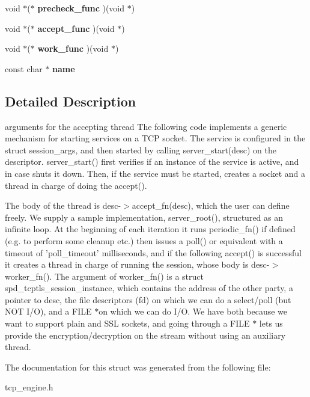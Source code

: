 \begin{DoxyCompactItemize}
\item 
\hypertarget{structspd__tcp__session__arg_ac015effc58bcab5bea3170e7c7cfa53c}{
void $\ast$($\ast$ {\bfseries precheck\_\-func} )(void $\ast$)}
\label{structspd__tcp__session__arg_ac015effc58bcab5bea3170e7c7cfa53c}

\item 
\hypertarget{structspd__tcp__session__arg_a3e7a2fb41f02b462df216cf56d269ee9}{
void $\ast$($\ast$ {\bfseries accept\_\-func} )(void $\ast$)}
\label{structspd__tcp__session__arg_a3e7a2fb41f02b462df216cf56d269ee9}

\item 
\hypertarget{structspd__tcp__session__arg_a23943ff609f6a23365b1bb234cc464ce}{
void $\ast$($\ast$ {\bfseries work\_\-func} )(void $\ast$)}
\label{structspd__tcp__session__arg_a23943ff609f6a23365b1bb234cc464ce}

\item 
\hypertarget{structspd__tcp__session__arg_a53e01dfdf07f6a394394e6e31a8e6afc}{
const char $\ast$ {\bfseries name}}
\label{structspd__tcp__session__arg_a53e01dfdf07f6a394394e6e31a8e6afc}

\end{DoxyCompactItemize}


\subsection{Detailed Description}
arguments for the accepting thread The following code implements a generic mechanism for starting services on a TCP socket. The service is configured in the struct session\_\-args, and then started by calling server\_\-start(desc) on the descriptor. server\_\-start() first verifies if an instance of the service is active, and in case shuts it down. Then, if the service must be started, creates a socket and a thread in charge of doing the accept().

The body of the thread is desc-\/$>$accept\_\-fn(desc), which the user can define freely. We supply a sample implementation, server\_\-root(), structured as an infinite loop. At the beginning of each iteration it runs periodic\_\-fn() if defined (e.g. to perform some cleanup etc.) then issues a poll() or equivalent with a timeout of 'poll\_\-timeout' milliseconds, and if the following accept() is successful it creates a thread in charge of running the session, whose body is desc-\/$>$worker\_\-fn(). The argument of worker\_\-fn() is a struct spd\_\-tcptls\_\-session\_\-instance, which contains the address of the other party, a pointer to desc, the file descriptors (fd) on which we can do a select/poll (but NOT I/O), and a FILE $\ast$on which we can do I/O. We have both because we want to support plain and SSL sockets, and going through a FILE $\ast$ lets us provide the encryption/decryption on the stream without using an auxiliary thread. 

The documentation for this struct was generated from the following file:\begin{DoxyCompactItemize}
\item 
tcp\_\-engine.h\end{DoxyCompactItemize}
